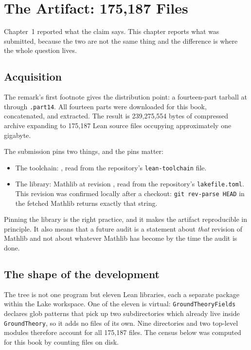 
\chapter{The Artifact: 175,187 Files}
\label{ch:artifact}

Chapter~1 reported what the claim says. This chapter reports what was
submitted, because the two are not the same thing and the difference is where
the whole question lives.

\section{Acquisition}The remark's first footnote gives the distribution point: a fourteen-part
tarball at  through \texttt{.part14}. All
fourteen parts were downloaded for this book, concatenated, and extracted. The
result is 239{,}275{,}554 bytes of compressed archive expanding to 175{,}187
Lean source files occupying approximately one gigabyte.

The submission pins two things, and the pins matter:

\begin{itemize}
\item The toolchain: , read from the
repository's \texttt{lean-toolchain} file.
\item The library: Mathlib at revision
, read from the repository's
\texttt{lakefile.toml}. This revision was confirmed locally after a checkout:
\texttt{git rev-parse HEAD} in the fetched Mathlib returns exactly that string.
\end{itemize}

Pinning the library is the right practice, and it makes the artifact
reproducible in principle. It also means that a future audit is a statement
about \emph{that} revision of Mathlib and not about whatever Mathlib has
become by the time the audit is done.

\section{The shape of the development}The tree is not one program but eleven Lean libraries, each a separate package
within the Lake workspace. One of the eleven is virtual: \texttt{GroundTheoryFields}
declares glob patterns that pick up two subdirectories which already live inside
\texttt{GroundTheory}, so it adds no files of its own. Nine directories and two
top-level modules therefore account for all 175{,}187 files. The census below was
computed for this book by counting files on disk.

